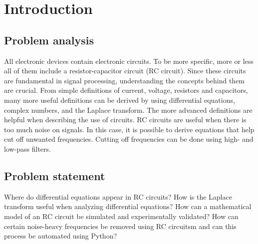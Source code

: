 \chapter{Introduction}
\section{Problem analysis}
All electronic devices contain electronic circuits. To be more specific, more or less all of them include a resistor-capacitor circuit (RC circuit). Since these circuits are fundamental in signal processing, understanding the concepts behind them are crucial. From simple definitions of current, voltage, resistors and capacitors, many more useful definitions can be derived by using differential equations, complex numbers, and the Laplace transform. The more advanced definitions are helpful when describing the use of circuits. RC circuits are useful when there is too much noise on signals. In this case, it is possible to derive equations that help cut off unwanted frequencies. Cutting off frequencies can be done using high- and low-pass filters. 
\section{Problem statement}
Where do differential equations appear in RC circuits? How is the Laplace transform useful when analyzing differential equations? How can a mathematical model of an RC circuit be simulated and experimentally validated? How can certain noise-heavy frequencies be removed using RC circuitsm and can this process be automated using Python?